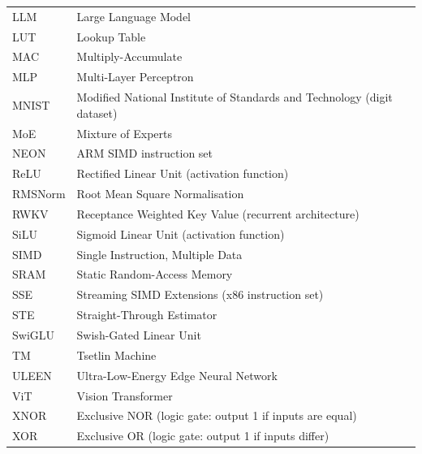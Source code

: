 \begin{tabular}{@{}ll@{}}
  LLM    & Large Language Model \\
  LUT    & Lookup Table \\
  MAC    & Multiply-Accumulate \\
  MLP    & Multi-Layer Perceptron \\
  MNIST  & Modified National Institute of Standards and Technology (digit dataset) \\
  MoE    & Mixture of Experts \\
  NEON   & ARM SIMD instruction set \\
  ReLU   & Rectified Linear Unit (activation function) \\
  RMSNorm & Root Mean Square Normalisation \\
  RWKV   & Receptance Weighted Key Value (recurrent architecture) \\
  SiLU   & Sigmoid Linear Unit (activation function) \\
  SIMD   & Single Instruction, Multiple Data \\
  SRAM   & Static Random-Access Memory \\
  SSE    & Streaming SIMD Extensions (x86 instruction set) \\
  STE    & Straight-Through Estimator \\
  SwiGLU & Swish-Gated Linear Unit \\
  TM     & Tsetlin Machine \\
  ULEEN  & Ultra-Low-Energy Edge Neural Network \\
  ViT    & Vision Transformer \\
  XNOR   & Exclusive NOR (logic gate: output 1 if inputs are equal) \\
  XOR    & Exclusive OR (logic gate: output 1 if inputs differ) \\
  \bottomrule
\end{tabular}
